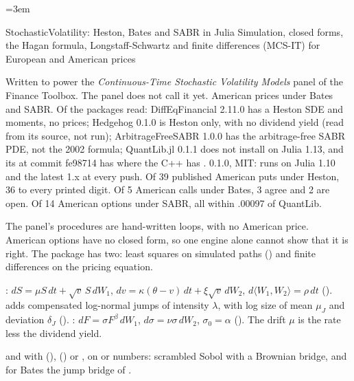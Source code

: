 \emergencystretch=3em

  {StochasticVolatility: Heston, Bates and SABR in Julia}
  {Simulation, closed forms, the Hagan formula, Longstaff-Schwartz and finite differences (MCS-IT) for European
   and American prices}

\factsheet
  {Written to power the \emph{Continuous-Time Stochastic Volatility Models} panel of the Finance Toolbox. The panel
   does not call it yet.}
  {American prices under Bates and SABR. Of the packages read: DiffEqFinancial 2.11.0 has a Heston SDE and moments, no
   prices; Hedgehog 0.1.0 is Heston only, with no dividend yield (read from its source, not run); ArbitrageFreeSABR
   1.0.0 has the arbitrage-free SABR PDE, not the 2002 formula; QuantLib.jl 0.1.1 does not install on Julia 1.13, and
   its  at commit fe98714 has  where the C++ has .}
  { 0.1.0, MIT:\newline
   \newline {}}
  { runs on Julia 1.10 and the latest 1.x at every push. Of 39 published American puts under
   Heston, 36 to every printed digit. Of 5 American calls under Bates, 3 agree and 2 are open. Of 14 American options
   under SABR, all within .00097 of QuantLib.}

The panel's procedures are hand-written loops, with no American price. American options have no closed form, so one
engine alone cannot show that it is right. The package has two: least squares on
simulated paths () and finite differences on the pricing equation.

: $dS = \mu S\,dt + \sqrt{v}\,S\,dW_1$, $dv = \kappa(\theta - v)\,dt + \xi\sqrt{v}\,dW_2$, $d\langle W_1, W_2\rangle = \rho\,dt$
().  adds compensated log-normal jumps of intensity $\lambda$, with log size
of mean $\mu_J$ and deviation $\delta_J$ (). : $dF = \sigma F^\beta\,dW_1$,
$d\sigma = \nu\sigma\,dW_2$, $\sigma_0 = \alpha$ (). The drift $\mu$ is the rate less
the dividend yield.

 and  with  (),
 () or , on  or  numbers:
scrambled Sobol with a Brownian bridge, and for Bates the jump bridge of .

